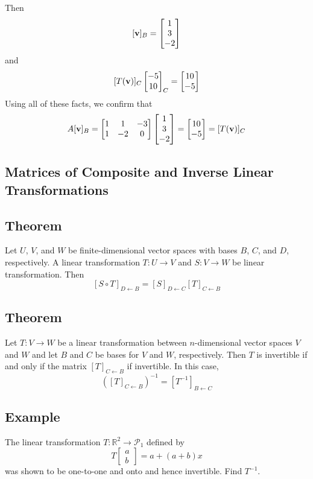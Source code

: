 Then
\[[\mathbf{v}]_B=\begin{bmatrix}
        1 \\3\\-2
    \end{bmatrix}\]
and
\[[T(\mathbf{v})]_C\begin{bmatrix}
        -5 \\10
    \end{bmatrix}_C=\begin{bmatrix}
        10 \\-5
    \end{bmatrix}\]
Using all of these facts, we confirm that
\[A[\mathbf{v}]_B=\begin{bmatrix}
        1 & 1  & -3 \\
        1 & -2 & 0
    \end{bmatrix}\begin{bmatrix}
        1 \\3\\-2
    \end{bmatrix}=\begin{bmatrix}
        10 \\-5
    \end{bmatrix}=[T(\mathbf{v})]_C\]

\subsection*{Matrices of Composite and Inverse Linear Transformations}

\subsection*{Theorem}
Let $U$, $V$, and $W$ be finite-dimensional vector spaces with bases $B$, $C$, and $D$,
respectively. A linear transformation $T: U\to V$ and $S: V\to W$ be linear transformation. Then
\[[S\circ T]_{D\leftarrow B}=[S]_{D\leftarrow C}[T]_{C\leftarrow B}\]

\subsection*{Theorem}
Let $T: V\to W$ be a linear transformation between $n$-dimensional vector spaces
$V$ and $W$ and let $B$ and $C$ be bases for $V$ and $W$, respectively.
Then $T$ is invertible if and only if the matrix $[T]_{C\leftarrow B}$ if invertible. In this case,
\[\left([T]_{C\leftarrow B}\right)^{-1}=[T^{-1}]_{B\leftarrow C}\]

\subsection*{Example}
The linear transformation $T:\mathbb{R}^2\to\mathscr{P}_1$ defined by
\[T\begin{bmatrix}
        a \\b
    \end{bmatrix}=a+(a+b)x\]
was shown to be one-to-one and onto and hence invertible. Find $T^{-1}$.


